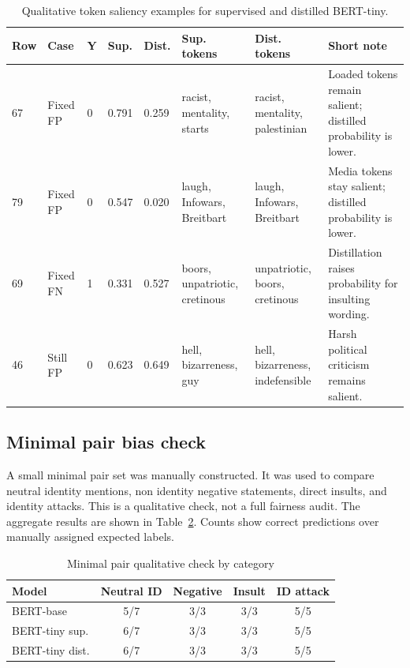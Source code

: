 \documentclass[pdflatex,sn-mathphys-num]{sn-jnl}
\begin{document}
\begin{table}[htbp]
\caption{Qualitative token saliency examples for supervised and distilled BERT-tiny.}
\label{tab:saliency-examples}
\centering
\tiny
\setlength{\tabcolsep}{1pt}
\begin{tabular}{p{0.45cm}p{1.25cm}p{0.35cm}p{0.55cm}p{0.55cm}p{2.2cm}p{2.2cm}p{2.2cm}}
\toprule
Row & Case & Y & Sup. & Dist. & Sup. tokens & Dist. tokens & Short note \\
\midrule
67 & Fixed FP & 0 & 0.791 & 0.259 & racist, mentality, starts & racist, mentality, palestinian & Loaded tokens remain salient; distilled probability is lower. \\
79 & Fixed FP & 0 & 0.547 & 0.020 & laugh, Infowars, Breitbart & laugh, Infowars, Breitbart & Media tokens stay salient; distilled probability is lower. \\
69 & Fixed FN & 1 & 0.331 & 0.527 & boors, unpatriotic, cretinous & unpatriotic, boors, cretinous & Distillation raises probability for insulting wording. \\
46 & Still FP & 0 & 0.623 & 0.649 & hell, bizarreness, guy & hell, bizarreness, indefensible & Harsh political criticism remains salient. \\
\bottomrule
\end{tabular}
\end{table}

\subsection{Minimal pair bias check}

A small minimal pair set was manually constructed.
It was used to compare neutral identity mentions, non identity negative statements, direct insults, and identity attacks.
This is a qualitative check, not a full fairness audit.
The aggregate results are shown in Table~\ref{tab:minimal-pair-bias}.
Counts show correct predictions over manually assigned expected labels.

\begin{table}[htbp]
\caption{Minimal pair qualitative check by category}
\label{tab:minimal-pair-bias}
\centering
\tiny
\begin{tabular}{lcccc}
\toprule
Model & Neutral ID & Negative & Insult & ID attack \\
\midrule
BERT-base & 5/7 & 3/3 & 3/3 & 5/5 \\
BERT-tiny sup. & 6/7 & 3/3 & 3/3 & 5/5 \\
BERT-tiny dist. & 6/7 & 3/3 & 3/3 & 5/5 \\
\bottomrule
\end{tabular}
\end{table}
\end{document}
